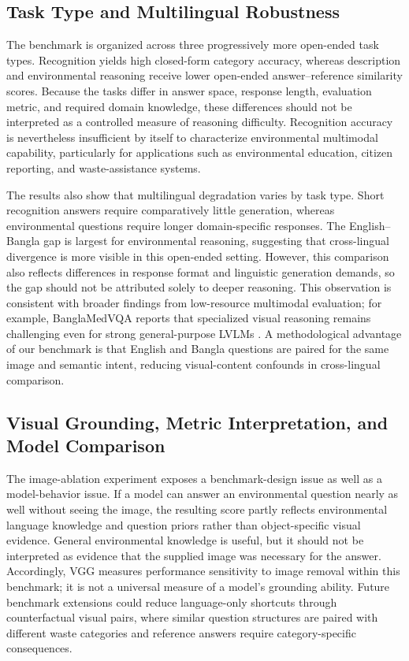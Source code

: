 \documentclass{article}
\begin{document}
\subsection{Task Type and Multilingual Robustness}
\label{subsec:task_multilingual_discussion}

The benchmark is organized across three progressively more open-ended task types. Recognition yields high closed-form category accuracy, whereas description and environmental reasoning receive lower open-ended answer--reference similarity scores. Because the tasks differ in answer space, response length, evaluation metric, and required domain knowledge, these differences should not be interpreted as a controlled measure of reasoning difficulty. Recognition accuracy is nevertheless insufficient by itself to characterize environmental multimodal capability, particularly for applications such as environmental education, citizen reporting, and waste-assistance systems.

The results also show that multilingual degradation varies by task type. Short recognition answers require comparatively little generation, whereas environmental questions require longer domain-specific responses. The English--Bangla gap is largest for environmental reasoning, suggesting that cross-lingual divergence is more visible in this open-ended setting. However, this comparison also reflects differences in response format and linguistic generation demands, so the gap should not be attributed solely to deeper reasoning. This observation is consistent with broader findings from low-resource multimodal evaluation; for example, BanglaMedVQA reports that specialized visual reasoning remains challenging even for strong general-purpose LVLMs \citep{ahmed2026banglamedvqa}. A methodological advantage of our benchmark is that English and Bangla questions are paired for the same image and semantic intent, reducing visual-content confounds in cross-lingual comparison.

\subsection{Visual Grounding, Metric Interpretation, and Model Comparison}
\label{subsec:grounding_metric_models}

The image-ablation experiment exposes a benchmark-design issue as well as a model-behavior issue. If a model can answer an environmental question nearly as well without seeing the image, the resulting score partly reflects environmental language knowledge and question priors rather than object-specific visual evidence. General environmental knowledge is useful, but it should not be interpreted as evidence that the supplied image was necessary for the answer. Accordingly, VGG measures performance sensitivity to image removal within this benchmark; it is not a universal measure of a model's grounding ability. Future benchmark extensions could reduce language-only shortcuts through counterfactual visual pairs, where similar question structures are paired with different waste categories and reference answers require category-specific consequences.
\end{document}
